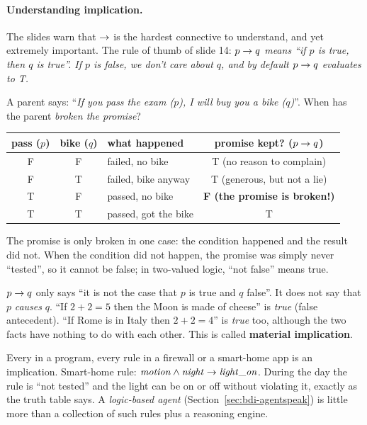 \paragraph{Understanding implication.} The slides warn that $\rightarrow$ is the hardest
connective to understand, and yet extremely important. The rule of thumb of slide 14:
\emph{$p \rightarrow q$ means ``if $p$ is true, then $q$ is true''. If $p$ is false, we don't care
about $q$, and by default $p \rightarrow q$ evaluates to T.}

\begin{nbintuition}
\notinslides
A parent says: ``\emph{If you pass the exam ($p$), I will buy you a bike ($q$)}''.
When has the parent \emph{broken the promise}?
\begin{center}
\small
\begin{tabular}{@{}ccl c@{}}
\toprule
pass ($p$) & bike ($q$) & what happened & promise kept? ($p\rightarrow q$) \\
\midrule
F & F & failed, no bike & T (no reason to complain) \\
F & T & failed, bike anyway & T (generous, but not a lie) \\
T & F & passed, no bike & \textbf{F (the promise is broken!)} \\
T & T & passed, got the bike & T \\
\bottomrule
\end{tabular}
\end{center}
The promise is only broken in one case: the condition happened and the result did not.
When the condition did not happen, the promise was simply never ``tested'', so it cannot be
false; in two-valued logic, ``not false'' means true.
\end{nbintuition}

\begin{nbwarning}
$p \rightarrow q$ only says ``it is not the case that $p$ is true and $q$ false''. It does not
say that $p$ \emph{causes} $q$. ``If $2+2=5$ then the Moon is made of cheese'' is
\emph{true} (false antecedent). ``If Rome is in Italy then $2+2=4$'' is \emph{true}
too, although the two facts have nothing to do with each other. This is called
\textbf{material implication}.
\end{nbwarning}

\begin{nbwhy}
Every  in a program, every rule in a firewall or a smart-home app is an
implication. Smart-home rule: $\mathit{motion} \land \mathit{night} \rightarrow \mathit{light\_on}$.
During the day the rule is ``not tested'' and the light can be on or off without
violating it, exactly as the truth table says. A \emph{logic-based agent}
(Section~\ref{sec:bdi-agentspeak}) is little more than a collection of such rules plus a
reasoning engine.
\end{nbwhy}

